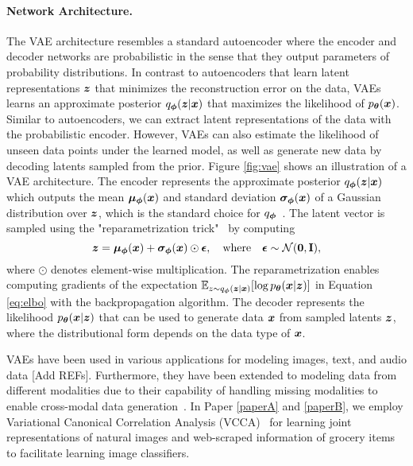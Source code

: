 \vspace{-3mm}
\paragraph{Network Architecture.} The VAE architecture resembles a standard autoencoder where the encoder and decoder networks are probabilistic in the sense that they output parameters of probability distributions. In contrast to autoencoders that learn latent representations ${\bm{z}}$ that minimizes the reconstruction error on the data, VAEs learns an approximate posterior $q_{{\bm{\phi}}}({\bm{z}} | {\bm{x}})$ that maximizes the likelihood of $p_{{\bm{\theta}}}({\bm{x}})$. Similar to autoencoders, we can extract latent representations of the data with the probabilistic encoder. However, VAEs can also estimate the likelihood of unseen data points under the learned model, as well as generate new data by decoding latents sampled from the prior. 
Figure \ref{fig:vae} shows an illustration of a VAE architecture. The encoder represents the approximate posterior $q_{{\bm{\phi}}}({\bm{z}} | {\bm{x}})$ which outputs the mean ${\bm{\mu}}_{{\bm{\phi}}}({\bm{x}})$ and standard deviation ${\bm{\sigma}}_{{\bm{\phi}}}({\bm{x}})$ of a Gaussian distribution over ${\bm{z}}$, which is the standard choice for $q_{{\bm{\phi}}}$~\cite{kingma2013auto}. The latent vector is sampled using the "reparametrization trick"~\cite{rezende2014stochastic, kingma2013auto} by computing 
\begin{equation}
	{\bm{z}} = {\bm{\mu}}_{{\bm{\phi}}}({\bm{x}}) + {\bm{\sigma}}_{{\bm{\phi}}}({\bm{x}}) \odot {\bm{\epsilon}}, \quad \text{where} \quad {\bm{\epsilon}} \sim {\mathcal{N}}(\bm{0}, \mathbf{I}),
\end{equation}
where $\odot$ denotes element-wise multiplication. The reparametrization enables computing gradients of the expectation $\mathbb{E}_{z \sim q_{{\bm{\phi}}}({\bm{z}} | {\bm{x}})}[\log p_{{\bm{\theta}}}({\bm{x}} | {\bm{z}})]$ in Equation \ref{eq:elbo} with the backpropagation algorithm. The decoder represents the likelihood $p_{{\bm{\theta}}}({\bm{x}} | {\bm{z}})$ that can be used to generate data ${\bm{x}}$ from sampled latents ${\bm{z}}$, where the distributional form depends on the data type of ${\bm{x}}$. 

\vspace{3mm}
VAEs have been used in various applications for modeling images, text, and audio data [Add REFs]. Furthermore, they have been extended to modeling data from different modalities due to their capability of handling missing modalities to enable cross-modal data generation~\cite{wang2016deep, wu2018multimodal, shi2019variational, vedantam2017generative, suzuki2016joint}. In Paper \ref{paperA} and \ref{paperB}, we employ Variational Canonical Correlation Analysis (VCCA)~\cite{wang2016deep} for learning joint representations of natural images and web-scraped information of grocery items to facilitate learning image classifiers. 



